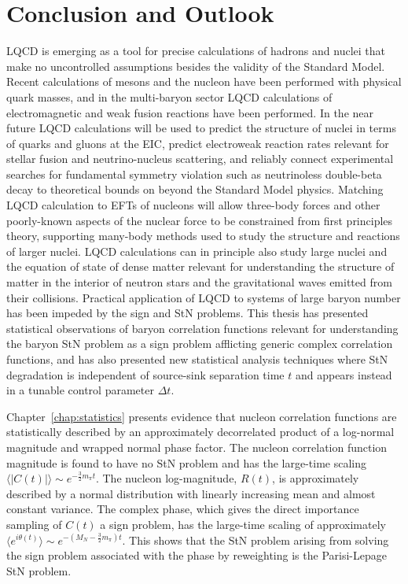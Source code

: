 \chapter{Conclusion and Outlook}\label{chap:conc}

LQCD is emerging as a tool for precise calculations of hadrons and nuclei
that make no uncontrolled assumptions besides the validity of the Standard Model.
Recent calculations of mesons and the nucleon have been performed with physical quark masses,
and in the multi-baryon sector LQCD calculations of electromagnetic and weak fusion reactions have been performed.
In the near future LQCD calculations will be used to predict the structure of nuclei in terms of quarks and gluons at the EIC,
predict electroweak reaction rates relevant for stellar fusion and neutrino-nucleus scattering,
and reliably connect experimental searches for fundamental symmetry violation such as neutrinoless double-beta decay to theoretical bounds on beyond the Standard Model physics.
Matching LQCD calculation to EFTs of nucleons will allow three-body forces and other poorly-known aspects of the nuclear force to be constrained from first principles theory, supporting many-body methods used to study the structure and reactions of larger nuclei.
LQCD calculations can in principle also study large nuclei and the equation of state of dense matter
relevant for understanding the structure of matter in the interior of neutron stars
and the gravitational waves emitted from their collisions.
Practical application of LQCD to systems of large baryon number has been impeded by the sign and StN problems.
This thesis has presented statistical observations of baryon correlation functions relevant for understanding the baryon StN problem as a sign problem afflicting generic complex correlation functions, and has also presented new statistical analysis techniques where
StN degradation is independent of source-sink separation time $t$
and appears instead in a tunable control parameter $\Delta t$.

Chapter~\ref{chap:statistics} presents evidence that nucleon correlation functions are statistically described by an approximately decorrelated product of a log-normal magnitude and wrapped normal phase factor.
The nucleon correlation function magnitude is found to have no StN problem and has the large-time scaling 
$\langle |C(t)| \rangle  \sim e^{-\frac{3}{2}m_\pi t}$. 
The nucleon log-magnitude, $R(t)$, is approximately described by a normal distribution with linearly increasing mean and almost constant variance. 
The complex phase, which gives the direct importance sampling of $C(t)$ a sign problem,  has the large-time scaling of approximately 
$\langle e^{i\theta(t)} \rangle \sim e^{-(M_N - \frac{3}{2}m_\pi)t}$.
This shows that the StN problem arising from solving the sign problem associated with the phase by reweighting is the Parisi-Lepage StN problem.



